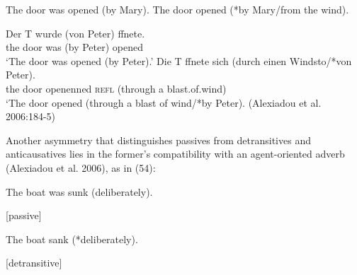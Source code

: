 \documentclass[10pt]{article}
\makeatletter
\newcommand{\boxit}{\@ifstar\@boxit\@@boxit}
\newcommand{\@@boxit}{\@boxit{1}}
\newcommand\@boxit[1]{%
\tikz[overlay,remember picture]{
\def\pointlist{}
\pgfmathsetmacro{\endpoint}{#1+1}
\foreach \x in {#1,...,\endpoint}
{\xdef\pointlist{\pointlist(\x)}}%
\node[draw,rectangle,yshift=2.6pt,semithick,
      fit=\pointlist,
      inner sep=-2.8pt,text depth=1\baselineskip] {};
}}
\makeatother
\begin{document}
 \begin{exe}
    \begin{xlist}
		\ex The door was opened (by Mary). \hspace{51mm}{[passive]} \vspace{-1mm}
		\ex The door opened (*by Mary/from the wind). \hspace{32mm}{[detransitive]}
	\end{xlist}
\end{exe}
\vspace{-4mm} 
\begin{exe}
    \begin{xlist}
		\ex
		\gll Der T wurde (von Peter) ffnete. \hspace{5mm}{[passive]}\\
            the door was (by Peter) opened  \\
            \trans `The door was opened (by Peter).'
			\ex
		\gll Die T ffnete sich (durch einen Windsto/*von Peter). \hspace{10mm}{[detransitive]}\\
           the door openenned \textsc{refl} (through a blast.of.wind) \\
            \trans `The door opened (through a blast of wind/*by Peter). (Alexiadou et al. 2006:184-5)
         
	\end{xlist}
\end{exe}

\noindent Another asymmetry that distinguishes passives from detransitives and anticausatives lies in the former's compatibility with an agent-oriented adverb (Alexiadou et al. 2006), as in (54):

  \begin{exe}
    \begin{xlist}
    \ex \begin{minipage}[t]{.6\textwidth}
		 The boat was sunk (\textsuperscript{\Checkmark}\hspace{-1mm}deliberately). 
		\end{minipage}%
	\begin{minipage}[t]{.2\textwidth}
        \hfill {[passive]}
	\end{minipage}%
	
    \ex \begin{minipage}[t]{.6\textwidth}
		 The boat sank (*deliberately).
		\end{minipage}%
	\begin{minipage}[t]{.2\textwidth}
        \hfill {[detransitive]}
	\end{minipage}%
	\end{xlist} 
\end{exe}
 
\end{document}
